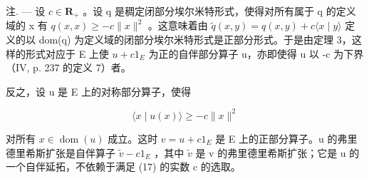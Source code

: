 注. --- 设 \(c \in \mathbf R_{+}\) 。设 q 是稠定闭部分埃尔米特形式，使得对所有属于 q 的定义域的 x 有 \(q(x, x) \geqslant -c \|x\|^2\) 。这意味着由 \(\widetilde{q}(x, y) = q(x, y) + c \langle x \mid y \rangle\) 定义的以 dom(q) 为定义域的闭部分埃尔米特形式是正部分形式。于是由定理 3，这样的形式对应于 E 上使 \(u + c1_{E}\) 为正的自伴部分算子 u，亦即使得 u 以 -c 为下界（IV, p. 237 的定义 7）者。

反之，设 u 是 E 上的对称部分算子，使得

\[
\langle x \mid u (x) \rangle \geqslant - c \| x \| ^ {2}\tag{17}
\]

对所有 \(x \in \operatorname{dom}(u)\) 成立。这时 \(v = u + c1_{E}\) 是 E 上的正部分算子。u 的弗里德里希斯扩张是自伴算子 \(\widetilde{v} - c1_{E}\) ，其中 \(\widetilde{v}\) 是 v 的弗里德里希斯扩张；它是 u 的一个自伴延拓，不依赖于满足 (17) 的实数 c 的选取。
\relax{}
